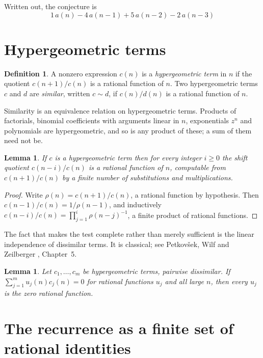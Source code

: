 \documentclass[11pt,a4paper]{article}
\theoremstyle{plain}
\newtheorem{lemma}[theorem]{Lemma}
\theoremstyle{definition}
\newtheorem{definition}[theorem]{Definition}
\begin{document}
Written out, the conjecture is
\begin{equation}\label{eq:conj}
1\,a(n) - 4\,a(n-1) + 5\,a(n-2) - 2\,a(n-3)
\end{equation}

\section{Hypergeometric terms}

\begin{definition}
A nonzero expression $c(n)$ is a \emph{hypergeometric term} in $n$ if the quotient
$c(n+1)/c(n)$ is a rational function of $n$. Two hypergeometric terms $c$ and $d$ are
\emph{similar}, written $c\sim d$, if $c(n)/d(n)$ is a rational function of $n$.
\end{definition}

Similarity is an equivalence relation on hypergeometric terms. Products of factorials,
binomial coefficients with arguments linear in $n$, exponentials $z^{n}$ and polynomials
are hypergeometric, and so is any product of these; a sum of them need not be.

\begin{lemma}\label{lem:shift}
If $c$ is a hypergeometric term then for every integer $i\ge 0$ the shift quotient
$c(n-i)/c(n)$ is a rational function of $n$, computable from $c(n+1)/c(n)$ by a finite
number of substitutions and multiplications.
\end{lemma}

\begin{proof}
Write $\rho(n)=c(n+1)/c(n)$, a rational function by hypothesis. Then
$c(n-1)/c(n)=1/\rho(n-1)$, and inductively
$c(n-i)/c(n)=\prod_{j=1}^{i}\rho(n-j)^{-1}$, a finite product of rational functions.
\end{proof}

The fact that makes the test complete rather than merely sufficient is the linear
independence of dissimilar terms. It is classical; see Petkov\v{s}ek, Wilf and Zeilberger
\cite{AB}, Chapter~5.

\begin{lemma}\label{lem:indep}
Let $c_{1},\dots,c_{m}$ be hypergeometric terms, pairwise dissimilar. If
$\sum_{j=1}^{m}u_{j}(n)c_{j}(n)=0$ for rational functions $u_{j}$ and all large $n$, then
every $u_{j}$ is the zero rational function.
\end{lemma}

\section{The recurrence as a finite set of rational identities}
\end{document}
